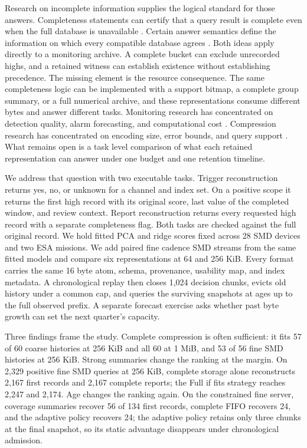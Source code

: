 \documentclass[a4paper,fleqn]{cas-dc}
\begin{document}
Research on incomplete information supplies the logical standard for those answers. Completeness statements can certify that a query result is complete even when the full database is unavailable \cite{RazniewskiNutt2011}. Certain answer semantics define the information on which every compatible database agrees \cite{Libkin2015}. Both ideas apply directly to a monitoring archive. A complete bucket can exclude unrecorded highs, and a retained witness can establish existence without establishing precedence. The missing element is the resource consequence. The same completeness logic can be implemented with a support bitmap, a complete group summary, or a full numerical archive, and these representations consume different bytes and answer different tasks. Monitoring research has concentrated on detection quality, alarm forecasting, and computational cost \cite{Strem2025APT,Mejri2024Evaluation}. Compression research has concentrated on encoding size, error bounds, and query support \cite{Jugel2014M4,Jensen2018ModelarDB,Tang2025IoTDB}. What remains open is a task level comparison of what each retained representation can answer under one budget and one retention timeline.

We address that question with two executable tasks. Trigger reconstruction returns yes, no, or unknown for a channel and index set. On a positive scope it returns the first high record with its original score, last value of the completed window, and review context. Report reconstruction returns every requested high record with a separate completeness flag. Both tasks are checked against the full original record. We hold fitted PCA and ridge scores fixed across 28 SMD devices and two ESA missions. We add paired fine cadence SMD streams from the same fitted models and compare six representations at 64 and 256 KiB. Every format carries the same 16 byte atom, schema, provenance, usability map, and index metadata. A chronological replay then closes 1,024 decision chunks, evicts old history under a common cap, and queries the surviving snapshots at ages up to the full observed prefix. A separate forecast exercise asks whether past byte growth can set the next quarter's capacity.

Three findings frame the study. Complete compression is often sufficient: it fits 57 of 60 coarse histories at 256 KiB and all 60 at 1 MiB, and 53 of 56 fine SMD histories at 256 KiB. Strong summaries change the ranking at the margin. On 2,329 positive fine SMD queries at 256 KiB, complete storage alone reconstructs 2,167 first records and 2,167 complete reports; the Full if fits strategy reaches 2,247 and 2,174. Age changes the ranking again. On the constrained fine server, coverage summaries recover 56 of 134 first records, complete FIFO recovers 24, and the adaptive policy recovers 24; the adaptive policy retains only three chunks at the final snapshot, so its static advantage disappears under chronological admission.
\end{document}
